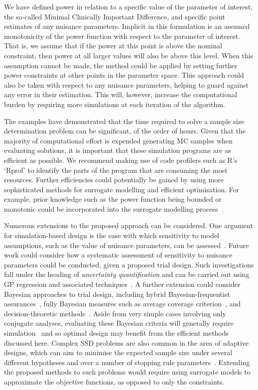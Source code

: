 \documentclass[sagev, Crown]{sagej}
\begin{document}
We have defined power in relation to a specific value of the parameter of interest, the so-called Minimal Clinically Important Difference, and specific point estimates of any nuisance parameters. Implicit in this formulation is an assumed monotonicity of the power function with respect to the parameter of interest. That is, we assume that if the power at this point is above the nominal constraint, then power at all larger values will also be above this level. When this assumption cannot be made, the method could be applied by setting further power constraints at other points in the parameter space. This approach could also be taken with respect to any nuisance parameters, helping to guard against any error in their estimation. This will, however, increase the computational burden by requiring more simulations at each iteration of the algorithm.

The examples have demonstrated that the time required to solve a sample size determination problem can be significant, of the order of hours. Given that the majority of computational effort is expended generating MC samples when evaluating solutions, it is important that these simulation programs are as efficient as possible. We recommend making use of code profilers such as R's `Rprof' to identify the parts of the program that are consuming the most resources. Further efficiencies could potentially be gained by using more sophisticated methods for surrogate modelling and efficient optimisation. For example, prior knowledge such as the power function being bounded or monotonic could be incorporated into the surrogate modelling process~\cite{Emmerich2011}.

Numerous extensions to the proposed approach can be considered. One argument for simulation-based design is the ease with which sensitivity to model assumptions, such as the value of nuisance parameters, can be assessed~\cite{Landau2013}. Future work could consider how a systematic assessment of sensitivity to nuisance parameters could be conducted, given a proposed trial design. Such investigations fall under the heading of \emph{uncertainty quantification} and can be carried out using GP regression and associated techniques~\cite{Kennedy2001}. A further extension could consider Bayesian approaches to trial design, including hybrid Bayesian-frequentist assurances~\cite{OHagan2005}, fully Bayesian measures such as average coverage criterion~\cite{Cao2009}, and decision-theoretic methods~\cite{Oakley2010}. Aside from very simple cases involving only conjugate analyses, evaluating these Bayesian criteria will generally require simulation~\cite{OHagan2005} and so optimal design may benefit from the efficient methods discussed here. Complex SSD problems are also common in the area of adaptive designs, which can aim to minimise the expected sample size under several different hypotheses and over a number of stopping rule parameters~\cite{Wason2012}.  Extending the proposed methods to such problems would require using surrogate models to approximate the objective functions, as opposed to only the constraints.
\end{document}
